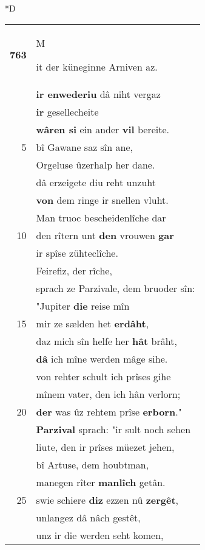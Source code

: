 \documentclass[8pt,a4paper,notitlepage]{article}
\begin{document}
\begin{table}[ht]
\begin{minipage}[t]{0.5\linewidth}
\small
\begin{center}*D
\end{center}
\begin{tabular}{rl}
\textbf{763} & \begin{large}M\end{large}it der küneginne Arniven az.\\ 
 & \textbf{ir enwederiu} dâ niht vergaz\\ 
 & \textbf{ir} gesellecheite\\ 
 & \textbf{wâren si} ein ander \textbf{vil} bereite.\\ 
5 & bî Gawane saz sîn ane,\\ 
 & Orgeluse ûzerhalp her dane.\\ 
 & dâ erzeigete diu reht unzuht\\ 
 & \textbf{von} dem ringe ir snellen vluht.\\ 
 & Man truoc bescheidenlîche dar\\ 
10 & den rîtern unt \textbf{den} vrouwen \textbf{gar}\\ 
 & ir spîse zühteclîche.\\ 
 & Feirefiz, der rîche,\\ 
 & sprach ze Parzivale, dem bruoder sîn:\\ 
 & "Jupiter \textbf{die} reise mîn\\ 
15 & mir ze sælden het \textbf{erdâht},\\ 
 & daz mich sîn helfe her \textbf{hât} brâht,\\ 
 & \textbf{dâ} ich mîne werden mâge sihe.\\ 
 & von rehter schult ich prîses gihe\\ 
 & mînem vater, den ich hân verlorn;\\ 
20 & \textbf{der} was ûz rehtem prîse \textbf{erborn}."\\ 
 & \textbf{Parzival} sprach: "ir sult noch sehen\\ 
 & liute, den ir prîses müezet jehen,\\ 
 & bî Artuse, dem houbtman,\\ 
 & manegen rîter \textbf{manlîch} getân.\\ 
25 & swie schiere \textbf{diz} ezzen nû \textbf{zergêt},\\ 
 & unlangez dâ nâch gestêt,\\ 
 & unz ir die werden seht komen,\\ 

\end{tabular}
\end{minipage}
\end{table}
\end{document}

